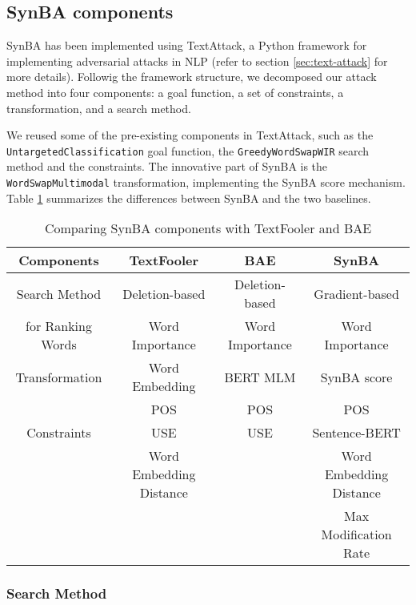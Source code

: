 \subsection{SynBA components}\label{subsec:synba-components}
SynBA has been implemented using TextAttack, a Python framework for implementing adversarial attacks in NLP (refer to section \ref{sec:text-attack} for more details).
Followig the framework structure, we decomposed our attack method into four components: a goal function, a set of constraints, a transformation, and a search method.

We reused some of the pre-existing components in TextAttack, such as the \texttt{UntargetedClassification} goal function, the \texttt{GreedyWordSwapWIR} search method and the constraints. 
The innovative part of SynBA is the \texttt{WordSwapMultimodal} transformation, implementing the SynBA score mechanism.
Table \ref{tab:3_3_comparing_components} summarizes the differences between SynBA and the two baselines.

\begin{table}[h]
    \footnotesize
\centering
\begin{tabular}{|c|c|c|c|}
\hline
\textbf{Components} & \textbf{TextFooler} & \textbf{BAE}  & \textbf{SynBA}\\ \hline
Search Method &  Deletion-based &   Deletion-based & Gradient-based\\ 
for Ranking Words & Word Importance & Word Importance & Word Importance \\ \hline
Transformation & Word Embedding & BERT MLM & SynBA score \\ \hline
 & POS  & POS & POS \\ 
 Constraints & USE & USE & Sentence-BERT \\ 
 & Word Embedding Distance &  & Word Embedding Distance \\ 
 &  &  & Max Modification Rate \\ \hline
 
\end{tabular}
\caption{Comparing SynBA components with TextFooler and BAE}
\label{tab:3_3_comparing_components}
\end{table}

\subsubsection{Search Method}\label{subsubsec:search-method}

